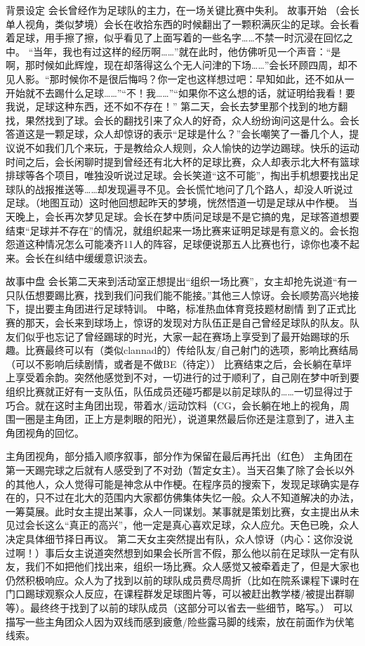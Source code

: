 背景设定
	会长曾经作为足球队的主力，在一场关键比赛中失利。
故事开始
	（会长单人视角，类似梦境）会长在收拾东西的时候翻出了一颗积满灰尘的足球。会长看着足球，用手擦了擦，似乎看见了上面写着的一些名字……不禁一时沉浸在回忆之中。
“当年，我也有过这样的经历啊……”就在此时，他仿佛听见一个声音：“是啊，那时候如此辉煌，现在却落得这么个无人问津的下场……”会长环顾四周，却不见人影。“那时候你不是很后悔吗？你一定也这样想过吧：早知如此，还不如从一开始就不去踢什么足球……”“不！我……”“如果你不这么想的话，就证明给我看！要我说，足球这种东西，还不如不存在！”
	第二天，会长去梦里那个找到的地方翻找，果然找到了球。会长的翻找引来了众人的好奇，众人纷纷询问这是什么。会长答道这是一颗足球，众人却惊讶的表示“足球是什么？”会长嘲笑了一番几个人，提议说不如我们几个来玩，于是教给众人规则，众人愉快的边学边踢球。快乐的运动时间之后，会长闲聊时提到曾经还有北大杯的足球比赛，众人却表示北大杯有篮球排球等各个项目，唯独没听说过足球。会长笑道“这不可能”，掏出手机想要找出足球队的战报推送等……却发现遍寻不见。会长慌忙地问了几个路人，却没人听说过足球。（地图互动）这时他回想起昨天的梦境，恍然悟道一切是足球从中作梗。
	当天晚上，会长再次梦见足球。会长在梦中质问足球是不是它搞的鬼，足球答道想要结束“足球并不存在”的情况，就组织起来一场比赛来证明足球是有意义的。会长抱怨道这种情况怎么可能凑齐11人的阵容，足球便说那五人比赛也行，谅你也凑不起来。会长在纠结中缓缓意识淡去。
	
故事中盘
	会长第二天来到活动室正想提出“组织一场比赛”，女主却抢先说道“有一只队伍想要踢比赛，找到我们问我们能不能接。”其他三人惊讶。会长顺势高兴地接下，提出要主角团进行足球特训。
	中略，标准热血体育竞技题材剧情
	到了正式比赛的那天，会长来到球场上，惊讶的发现对方队伍正是自己曾经足球队的队友。队友们似乎也忘记了曾经踢球的时光，大家一起在赛场上享受到了最开始踢球的乐趣。比赛最终可以有（类似clannad的）传给队友/自己射门的选项，影响比赛结局（可以不影响后续剧情，或者是不做BE（待定））
	比赛结束之后，会长躺在草坪上享受着余韵。突然他感觉到不对，一切进行的过于顺利了，自己刚在梦中听到要组织比赛就正好有一支队伍，队伍成员还碰巧都是以前足球队的……一切显得过于巧合。就在这时主角团出现，带着水/运动饮料（CG，会长躺在地上的视角，周围一圈是主角团，正上方是刺眼的阳光），说道果然最后你还是注意到了，进入主角团视角的回忆。

主角团视角，部分插入顺序叙事，部分作为保留在最后再托出（红色）
	主角团在第一天踢完球之后就有人感受到了不对劲（暂定女主）。当天召集了除了会长以外的其他人，众人觉得可能是神念从中作梗。在程序员的搜索下，发现足球确实是存在的，只不过在北大的范围内大家都仿佛集体失忆一般。众人不知道解决的办法，一筹莫展。此时女主提出某事，众人一同谋划。某事就是策划比赛，女主提出从未见过会长这么“真正的高兴”，他一定是真心喜欢足球，众人应允。天色已晚，众人决定具体细节择日再议。
	第二天女主突然提出有队，众人惊讶（内心：这你没说过啊！）事后女主说道突然想到如果会长所言不假，那么他以前在足球队一定有队友，我们不如把他们找出来，组织一场比赛。众人感觉又被牵着走了，但是大家也仍然积极响应。众人为了找到以前的球队成员费尽周折（比如在院系课程下课时在门口踢球观察众人反应，在课程群发足球图片等，可以被赶出教学楼/被提出群聊等）。最终终于找到了以前的球队成员（这部分可以省去一些细节，略写。）
	可以描写一些主角团众人因为双线而感到疲惫/险些露马脚的线索，放在前面作为伏笔线索。

